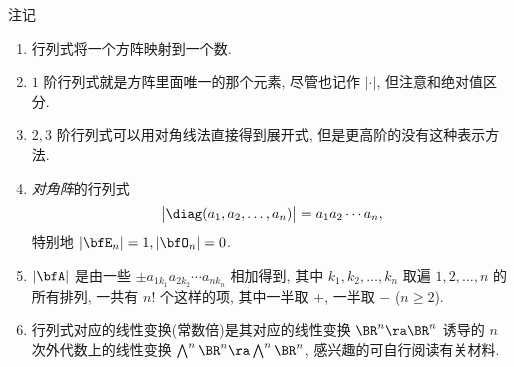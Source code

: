 \begin{frame}{注记}
	\begin{enumerate}
		\item 行列式将一个方阵映射到一个数.
		\item $1$ 阶行列式就是方阵里面唯一的那个元素, 尽管也记作 $|\cdot|$, 但注意和绝对值区分.
		\item $2,3$ 阶行列式可以用对角线法直接得到展开式, 但是更高阶的没有这种表示方法.
		\item \emph{对角阵}的行列式
		\[\bigl|\diag(a_1,a_2,\dots,a_n)\bigr|=a_1a_2\cdots a_n,\]
		特别地 $|\bfE_n|=1,|\bfO_n|=0$.
		\item $|\bfA|$ 是由一些 $\pm a_{1 k_1}a_{2 k_2}\cdots a_{n k_n}$ 相加得到, 其中 $k_1,k_2,\dots,k_n$ 取遍 $1,2,\dots,n$ 的所有排列, 一共有 $n!$ 个这样的项, 其中一半取 $+$, 一半取 $-$ ($n\ge2$).
		\item 行列式对应的线性变换(常数倍)是其对应的线性变换 $\BR^n\ra\BR^n$ 诱导的 $n$ 次外代数上的线性变换 $\bigwedge^n\BR^n\ra \bigwedge^n\BR^n$, 感兴趣的可自行阅读有关材料.
	\end{enumerate}
\end{frame}




